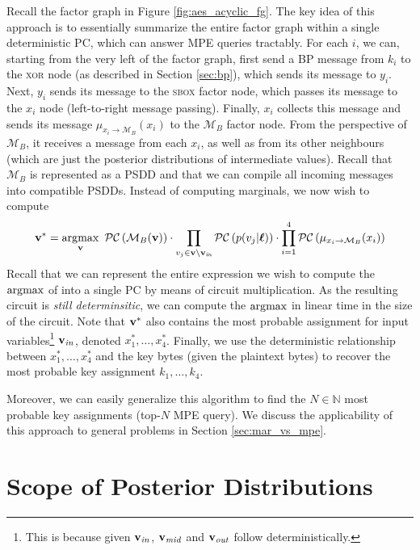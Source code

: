 Recall the factor graph in Figure \ref{fig:aes_acyclic_fg}. The key idea of this approach is to essentially summarize the entire factor graph within a single deterministic PC, which can answer MPE queries tractably. For each $i$, we can, starting from the very left of the factor graph, first send a BP message from $k_i$ to the \textsc{xor} node (as described in Section \ref{sec:bp}), which sends its message to $y_i$. Next, $y_i$ sends its message to the \textsc{sbox} factor node, which passes its message to the $x_i$ node (left-to-right message passing). Finally, $x_i$ collects this message and sends its message $\mu_{x_i \to \mathcal{M}_B}(x_i)$ to the $\mathcal{M}_B$ factor node.
From the perspective of $\mathcal{M}_B$, it receives a message from each $x_i$, as well as from its other neighbours (which are just the posterior distributions of intermediate values).
Recall that $\mathcal{M}_B$ is represented as a PSDD and that we can compile all incoming messages into compatible PSDDs. Instead of computing marginals, we now wish to compute
\begin{align}
\label{eq:pc_argmax}
    \mathbf{v}^* = \operatorname*{\arg\!\max}_{\mathbf{v}} \ \mathcal{PC} \left( \mathcal{M}_B(\mathbf{v}) \right) \cdot \prod_{v_j \in \mathbf{v} \setminus \mathbf{v}_{\mathit{in}}} \mathcal{PC}\left( p(v_j | \boldsymbol{\ell}) \right) \cdot \prod_{i=1}^4 \mathcal{PC} \left( \mu_{x_i \to \mathcal{M}_B}(x_i) \right)
\end{align}
Recall that we can represent the entire expression we wish to compute the $\operatorname*{\arg\!\max}$ of into a single PC by means of circuit multiplication. As the resulting circuit is \emph{still determinsitic}, we can compute the $\operatorname*{\arg\!\max}$ in linear time in the size of the circuit. Note that $\mathbf{v}^*$ also contains the most probable assignment for input variables\footnote{This is because given $\mathbf{v}_{\mathit{in}}$, $\mathbf{v}_{\mathit{mid}}$ and $\mathbf{v}_{\mathit{out}}$ follow deterministically.} $\mathbf{v}_{\mathit{in}}$, denoted $x_1^*,\dots,x_4^*$. Finally, we use the deterministic relationship between $x_1^*,\dots,x_4^*$ and the key bytes (given the plaintext bytes) to recover the most probable key assignment $k_1,\dots,k_4$.

Moreover, we can easily generalize this algorithm to find the $N \in \mathbb{N}$ most probable key assignments (top-$N$ MPE query). We discuss the applicability of this approach to general problems in Section \ref{sec:mar_vs_mpe}.

\section{Scope of Posterior Distributions}
\label{sec:scopes}

